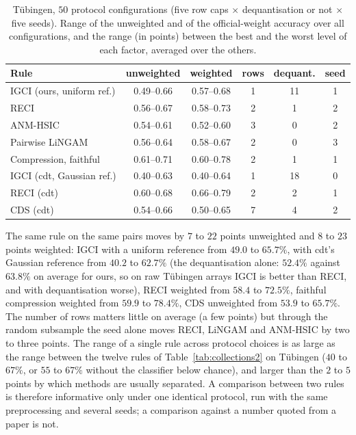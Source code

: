 \begin{table}[t]
\caption{T\"ubingen, $50$ protocol configurations (five row caps $\times$ dequantisation or not $\times$ five seeds). Range of the unweighted and of the official-weight accuracy over all configurations, and the range (in points) between the best and the worst level of each factor, averaged over the others.}
\label{tab:protocol}
\small
\begin{tabular}{@{}lccccc@{}}
\toprule
Rule & unweighted & weighted & rows & dequant. & seed\\
\midrule
IGCI (ours, uniform ref.) & 0.49--0.66 & 0.57--0.68 & 1 & 11 & 1\\
RECI & 0.56--0.67 & 0.58--0.73 & 2 & 1 & 2\\
ANM-HSIC & 0.54--0.61 & 0.52--0.60 & 3 & 0 & 2\\
Pairwise LiNGAM & 0.56--0.64 & 0.58--0.67 & 2 & 0 & 3\\
Compression, faithful & 0.61--0.71 & 0.60--0.78 & 2 & 1 & 1\\
IGCI (cdt, Gaussian ref.) & 0.40--0.63 & 0.40--0.64 & 1 & 18 & 0\\
RECI (cdt) & 0.60--0.68 & 0.66--0.79 & 2 & 2 & 1\\
CDS (cdt) & 0.54--0.66 & 0.50--0.65 & 7 & 4 & 2\\
\bottomrule
\end{tabular}
\end{table}

The same rule on the same pairs moves by $7$ to $22$ points unweighted and $8$ to $23$ points weighted: IGCI with a uniform reference from $49.0$ to $65.7\%$, with cdt's Gaussian reference from $40.2$ to $62.7\%$ (the dequantisation alone: $52.4\%$ against $63.8\%$ on average for ours, so on raw T\"ubingen arrays IGCI is better than RECI, and with dequantisation worse), RECI weighted from $58.4$ to $72.5\%$, faithful compression weighted from $59.9$ to $78.4\%$, CDS unweighted from $53.9$ to $65.7\%$. The number of rows matters little on average (a few points) but through the random subsample the seed alone moves RECI, LiNGAM and ANM-HSIC by two to three points. The range of a single rule across protocol choices is as large as the range between the twelve rules of Table~\ref{tab:collections2} on T\"ubingen ($40$ to $67\%$, or $55$ to $67\%$ without the classifier below chance), and larger than the $2$ to $5$ points by which methods are usually separated. A comparison between two rules is therefore informative only under one identical protocol, run with the same preprocessing and several seeds; a comparison against a number quoted from a paper is not.
